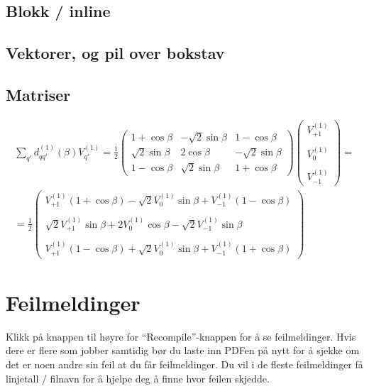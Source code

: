             \subsection{Blokk / inline}
            
            \subsection{Vektorer, og pil over bokstav}
            
            \subsection{Matriser}
            
        \begin{align*}
            \sum_{q'}d_{qq'}^{(1)}(\beta)V_{q'}^{(1)} = \frac{1}{2}\begin{pmatrix}1+\cos\beta & -\sqrt{2}\sin\beta & 1-\cos\beta \\ \sqrt{2}\sin\beta & 2\cos\beta & -\sqrt{2}\sin\beta \\ 1-\cos\beta & \sqrt{2}\sin\beta & 1+\cos\beta \end{pmatrix}\begin{pmatrix} V_{+1}^{(1)} \\ \\ V_{0}^{(1)} \\ \\ V_{-1}^{(1)}\end{pmatrix} = \\ =
            \frac{1}{2}\begin{pmatrix}V_{+1}^{(1)}(1+\cos\beta) -\sqrt{2}V_0^{(1)}\sin\beta + V_{-1}^{(1)}(1-\cos\beta) \\ \\ \sqrt{2}V_{+1}^{(1)}\sin\beta + 2V_0^{(1)}\cos\beta -\sqrt{2}V_{-1}^{(1)}\sin\beta \\ \\ V_{+1}^{(1)}(1-\cos\beta) + \sqrt{2}V_0^{(1)}\sin\beta + V_{-1}^{(1)}(1+\cos\beta) \end{pmatrix}
        \end{align*}
    
    
    
\section{Feilmeldinger} \label{sec:feilmeldinger}
    Klikk på knappen til høyre for ``Recompile''-knappen for å se feilmeldinger. 
        Hvis dere er flere som jobber samtidig bør du laste inn PDFen på nytt for å sjekke om det er noen andre sin feil at du får feilmeldinger.
        Du vil i de fleste feilmeldinger få linjetall / filnavn for å hjelpe deg å finne hvor feilen skjedde.
